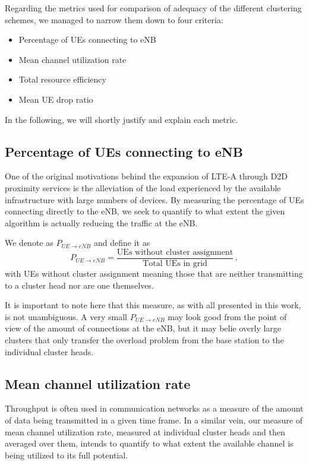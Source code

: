 Regarding the metrics used for comparison of adequacy of the different clustering schemes, we managed to narrow them down to four criteria:

\begin{itemize}
\item Percentage of UEs connecting to eNB
\item Mean channel utilization rate
\item Total resource efficiency
\item Mean UE drop ratio
\end{itemize}

In the following, we will shortly justify and explain each metric.

\subsection{Percentage of UEs connecting to eNB}
One of the original motivations behind the expansion of LTE-A through D2D proximity services is the alleviation of the load experienced by the available infrastructure with large numbers of devices. By measuring the percentage of UEs connecting directly to the eNB, we seek to quantify to what extent the given algorithm is actually reducing the traffic at the eNB.

We denote as $P_{UE\rightarrow eNB}$ and define it as
\begin{equation}\label{eq:con_eNB}
P_{UE\rightarrow eNB} = \frac {\text{UEs without cluster assignment}}{\text{Total UEs in grid}}\,,
\end{equation}
with UEs without cluster assignment meaning those that are neither transmitting to a cluster head nor are one themselves.

It is important to note here that this measure, as with all presented in this work, is not unambiguous. A very small $P_{UE\rightarrow eNB}$ may look good from the point of view of the amount of connections at the eNB, but it may belie overly large clusters that only transfer the overload problem from the base station to the individual cluster heads.

\subsection{Mean channel utilization rate}
Throughput is often used in communication networks as a measure of the amount of data being transmitted in a given time frame. In a similar vein, our measure of mean channel utilization rate, measured at individual cluster heads and then averaged over them, intends to quantify to what extent the available channel is being utilized to its full potential.


